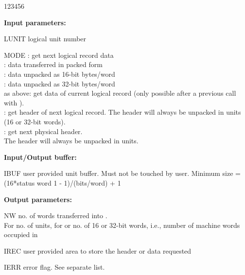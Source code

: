 \begin{DLtt}{123456}
\item[{\rm\bf Input parameters:}]
\item[LUNIT] logical unit number
\item[MODE]  : get next logical record data\\
             : data transferred in packed form\\
             : data unpacked as 16-bit bytes/word\\
             : data unpacked as 32-bit bytes/word\\
             as above: get data of current logical record
            (only possible after a previous call with ).\\
             : get header of next logical record. The header will
             always be unpacked in units (16 or 32-bit words).\\
             : get next physical header.\\
            The header will always be unpacked in units.
\item[{\rm\bf Input/Output buffer:}]
\item[IBUF] user provided unit buffer. Must not be touched by user.
            Minimum size = (16*status word 1 - 1)/(bits/word) + 1
\item[{\rm\bf Output parameters:}]
\item[NW] no. of words transferred into .\\
          For  no. of units, for  or  
          no. of 16 or 32-bit words, i.e.,
          number of machine words occupied in 
\item[IREC] user provided area to store the header or data requested
\item[IERR] error flag. See separate list.
\end{DLtt}
